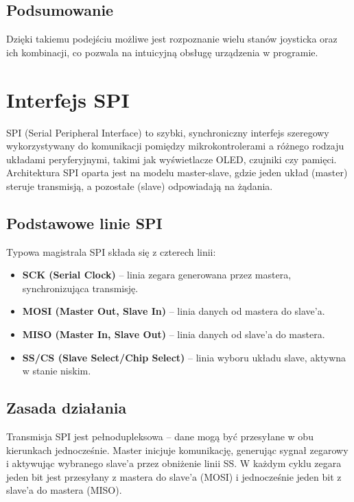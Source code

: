 \documentclass[a4paper,12pt]{report}
\begin{document}
\subsection*{Podsumowanie}

Dzięki takiemu podejściu możliwe jest rozpoznanie wielu stanów joysticka oraz ich kombinacji, co pozwala na intuicyjną obsługę urządzenia w programie.

\section{Interfejs SPI}

SPI (Serial Peripheral Interface) to szybki, synchroniczny interfejs szeregowy wykorzystywany do komunikacji pomiędzy mikrokontrolerami a różnego rodzaju układami peryferyjnymi, takimi jak wyświetlacze OLED, czujniki czy pamięci. Architektura SPI oparta jest na modelu master-slave, gdzie jeden układ (master) steruje transmisją, a pozostałe (slave) odpowiadają na żądania.

\subsection*{Podstawowe linie SPI}

Typowa magistrala SPI składa się z czterech linii:
\begin{itemize}
    \item \textbf{SCK (Serial Clock)} – linia zegara generowana przez mastera, synchronizująca transmisję.
    \item \textbf{MOSI (Master Out, Slave In)} – linia danych od mastera do slave'a.
    \item \textbf{MISO (Master In, Slave Out)} – linia danych od slave'a do mastera.
    \item \textbf{SS/CS (Slave Select/Chip Select)} – linia wyboru układu slave, aktywna w stanie niskim.
\end{itemize}

\subsection*{Zasada działania}

Transmisja SPI jest pełnodupleksowa – dane mogą być przesyłane w obu kierunkach jednocześnie. Master inicjuje komunikację, generując sygnał zegarowy i aktywując wybranego slave'a przez obniżenie linii SS. W każdym cyklu zegara jeden bit jest przesyłany z mastera do slave'a (MOSI) i jednocześnie jeden bit z slave'a do mastera (MISO).
\end{document}
